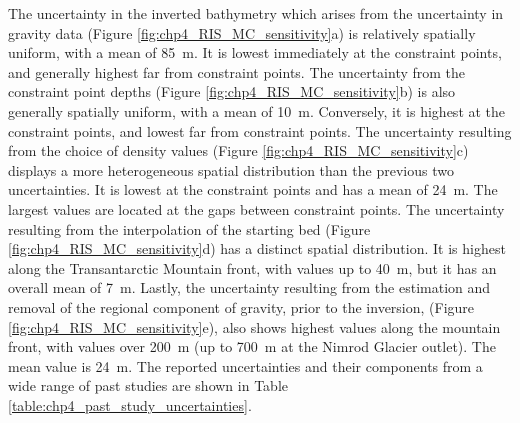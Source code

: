 The uncertainty in the inverted bathymetry which arises from the uncertainty in gravity data (Figure \ref{fig:chp4_RIS_MC_sensitivity}a) is relatively spatially uniform, with a mean of 85~m. It is lowest immediately at the constraint points, and generally highest far from constraint points. The uncertainty from the constraint point depths (Figure \ref{fig:chp4_RIS_MC_sensitivity}b) is also generally spatially uniform, with a mean of 10~m. Conversely, it is highest at the constraint points, and lowest far from constraint points. The uncertainty resulting from the choice of density values (Figure \ref{fig:chp4_RIS_MC_sensitivity}c) displays a more heterogeneous spatial distribution than the previous two uncertainties. It is lowest at the constraint points and has a mean of 24~m. The largest values are located at the gaps between constraint points. The uncertainty resulting from the interpolation of the starting bed (Figure \ref{fig:chp4_RIS_MC_sensitivity}d) has a distinct spatial distribution. It is highest along the Transantarctic Mountain front, with values up to 40~m, but it has an overall mean of 7~m. Lastly, the uncertainty resulting from the estimation and removal of the regional component of gravity, prior to the inversion, (Figure \ref{fig:chp4_RIS_MC_sensitivity}e), also shows highest values along the mountain front, with values over 200~m (up to 700~m at the Nimrod Glacier outlet). The mean value is 24~m. The reported uncertainties and their components from a wide range of past studies are shown in Table \ref{table:chp4_past_study_uncertainties}. \\


